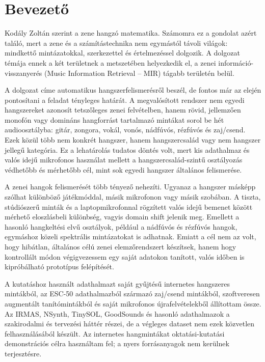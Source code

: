 \chapter{Bevezető}
\label{chap:bevezeto}

Kodály Zoltán szerint a zene hangzó matematika. Számomra ez a gondolat azért
találó, mert a zene és a számítástechnika nem egymástól távoli világok: mindkettő
mintázatokkal, szerkezettel és értelmezéssel dolgozik. A dolgozat témája ennek a
két területnek a metszetében helyezkedik el, a zenei információ-visszanyerés
(Music Information Retrieval -- MIR) tágabb területén belül.

A dolgozat címe automatikus hangszerfelismerésről beszél, de fontos már az elején
pontosítani a feladat tényleges határát. A megvalósított rendszer nem egyedi
hangszereket azonosít tetszőleges zenei felvételben, hanem rövid, jellemzően
monofón vagy domináns hangforrást tartalmazó mintákat sorol be hét audioosztályba:
gitár, zongora, vokál, vonós, nádfúvós, rézfúvós és zaj/csend. Ezek közül több
nem konkrét hangszer, hanem hangszercsalád vagy nem hangszer jellegű kategória.
Ez a lehatárolás tudatos döntés volt, mert kis adathalmaz és valós idejű
mikrofonos használat mellett a hangszercsalád-szintű osztályozás védhetőbb és
mérhetőbb cél, mint sok egyedi hangszer általános felismerése.

A zenei hangok felismerését több tényező nehezíti. Ugyanaz a hangszer másképp
szólhat különböző játékmóddal, másik mikrofonon vagy másik szobában. A tiszta,
stúdiószerű minták és a laptopmikrofonnal rögzített valós idejű bemenet között
mérhető eloszlásbeli különbség, vagyis domain shift jelenik meg. Emellett a
hasonló hangkeltési elvű osztályok, például a nádfúvós és rézfúvós hangok,
egymáshoz közeli spektrális mintázatokat is adhatnak. Emiatt a cél nem az volt,
hogy hibátlan, általános célú zenei elemzőrendszert készítsek, hanem hogy
kontrollált módon végigvezessem egy saját adatokon tanított, valós időben is
kipróbálható prototípus felépítését.

A kutatáshoz használt adathalmazt saját gyűjtésű internetes hangszeres
mintákból, az ESC-50 adathalmazból származó zaj/csend mintákból, szoftveresen
augmentált tanítómintákból és saját mikrofonos újrafelvételekből állítottam
össze. Az IRMAS, NSynth, TinySOL, GoodSounds és hasonló adathalmazok a
szakirodalmi és tervezési háttér részei, de a végleges dataset nem ezek
közvetlen felhasználásából készült. Az internetes hangmintákat
oktatási-kutatási demonstrációs célra használtam fel; a nyers forrásanyagok nem
kerülnek terjesztésre.

